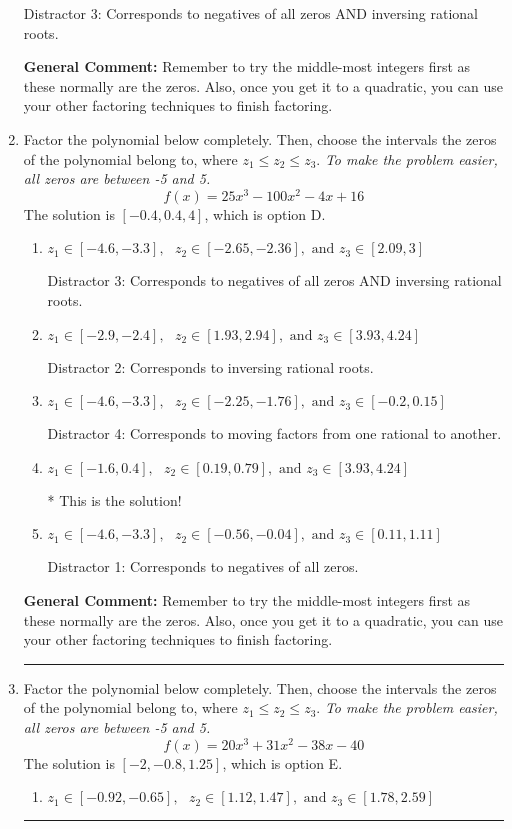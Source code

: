 \documentclass{extbook}[14pt]
\newcommand{\litem}[1]{\item #1

\rule{\textwidth}{0.4pt}}
\begin{document}
\begin{enumerate}
{\begin{enumerate}[label=\Alph*.]
 Distractor 3: Corresponds to negatives of all zeros AND inversing rational roots.
\end{enumerate}

\textbf{General Comment:} Remember to try the middle-most integers first as these normally are the zeros. Also, once you get it to a quadratic, you can use your other factoring techniques to finish factoring.
}
\litem{
Factor the polynomial below completely. Then, choose the intervals the zeros of the polynomial belong to, where $z_1 \leq z_2 \leq z_3$. \textit{To make the problem easier, all zeros are between -5 and 5.}
\[ f(x) = 25x^{3} -100 x^{2} -4 x + 16 \]The solution is \( [-0.4, 0.4, 4] \), which is option D.\begin{enumerate}[label=\Alph*.]
\item \( z_1 \in [-4.6, -3.3], \text{   }  z_2 \in [-2.65, -2.36], \text{   and   } z_3 \in [2.09, 3] \)

 Distractor 3: Corresponds to negatives of all zeros AND inversing rational roots.
\item \( z_1 \in [-2.9, -2.4], \text{   }  z_2 \in [1.93, 2.94], \text{   and   } z_3 \in [3.93, 4.24] \)

 Distractor 2: Corresponds to inversing rational roots.
\item \( z_1 \in [-4.6, -3.3], \text{   }  z_2 \in [-2.25, -1.76], \text{   and   } z_3 \in [-0.2, 0.15] \)

 Distractor 4: Corresponds to moving factors from one rational to another.
\item \( z_1 \in [-1.6, 0.4], \text{   }  z_2 \in [0.19, 0.79], \text{   and   } z_3 \in [3.93, 4.24] \)

* This is the solution!
\item \( z_1 \in [-4.6, -3.3], \text{   }  z_2 \in [-0.56, -0.04], \text{   and   } z_3 \in [0.11, 1.11] \)

 Distractor 1: Corresponds to negatives of all zeros.
\end{enumerate}

\textbf{General Comment:} Remember to try the middle-most integers first as these normally are the zeros. Also, once you get it to a quadratic, you can use your other factoring techniques to finish factoring.
}
\litem{
Factor the polynomial below completely. Then, choose the intervals the zeros of the polynomial belong to, where $z_1 \leq z_2 \leq z_3$. \textit{To make the problem easier, all zeros are between -5 and 5.}
\[ f(x) = 20x^{3} +31 x^{2} -38 x -40 \]The solution is \( [-2, -0.8, 1.25] \), which is option E.\begin{enumerate}[label=\Alph*.]
\item \( z_1 \in [-0.92, -0.65], \text{   }  z_2 \in [1.12, 1.47], \text{   and   } z_3 \in [1.78, 2.59] \)


\end{enumerate}}
\end{enumerate}
\end{document}
